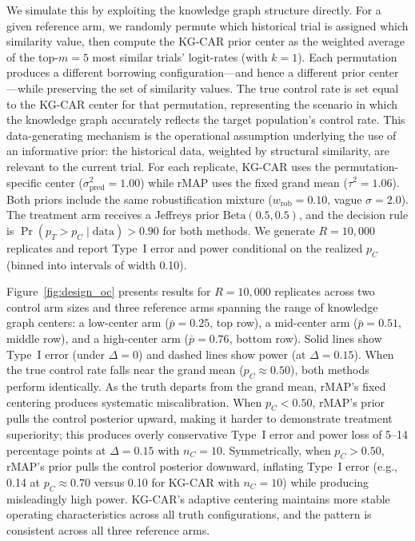 \documentclass[12pt]{article}
\begin{document}
We simulate this by exploiting the knowledge graph structure directly. For a given reference arm, we randomly permute which historical trial is assigned which similarity value, then compute the KG-CAR prior center as the weighted average of the top-$m = 5$ most similar trials' logit-rates (with $k = 1$). Each permutation produces a different borrowing configuration---and hence a different prior center---while preserving the set of similarity values. The true control rate is set equal to the KG-CAR center for that permutation, representing the scenario in which the knowledge graph accurately reflects the target population's control rate. This data-generating mechanism is the operational assumption underlying the use of an informative prior: the historical data, weighted by structural similarity, are relevant to the current trial. For each replicate, KG-CAR uses the permutation-specific center ($\sigma^2_{\text{pred}} = 1.00$) while rMAP uses the fixed grand mean ($\tau^2 = 1.06$). Both priors include the same robustification mixture ($w_{\text{rob}} = 0.10$, vague $\sigma = 2.0$). The treatment arm receives a Jeffreys prior $\text{Beta}(0.5, 0.5)$, and the decision rule is $\Pr(p_T > p_C \mid \text{data}) > 0.90$ for both methods. We generate $R = 10{,}000$ replicates and report Type~I error and power conditional on the realized $p_C$ (binned into intervals of width 0.10).

Figure~\ref{fig:design_oc} presents results for $R = 10{,}000$ replicates across two control arm sizes and three reference arms spanning the range of knowledge graph centers: a low-center arm ($\bar{p} = 0.25$, top row), a mid-center arm ($\bar{p} = 0.51$, middle row), and a high-center arm ($\bar{p} = 0.76$, bottom row). Solid lines show Type~I error (under $\Delta = 0$) and dashed lines show power (at $\Delta = 0.15$). When the true control rate falls near the grand mean ($p_C \approx 0.50$), both methods perform identically. As the truth departs from the grand mean, rMAP's fixed centering produces systematic miscalibration. When $p_C < 0.50$, rMAP's prior pulls the control posterior upward, making it harder to demonstrate treatment superiority; this produces overly conservative Type~I error and power loss of 5--14 percentage points at $\Delta = 0.15$ with $n_C = 10$. Symmetrically, when $p_C > 0.50$, rMAP's prior pulls the control posterior downward, inflating Type~I error (e.g., 0.14 at $p_C \approx 0.70$ versus 0.10 for KG-CAR with $n_C = 10$) while producing misleadingly high power. KG-CAR's adaptive centering maintains more stable operating characteristics across all truth configurations, and the pattern is consistent across all three reference arms.
\end{document}
